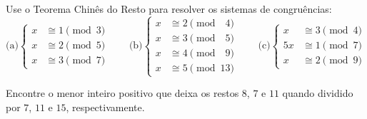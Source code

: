 \begin{homework}
    Use o Teorema Chinês do Resto para resolver os sistemas de congruências:
    $$
    \text{(a)}
    \left\{
            \begin{aligned}
                x&\cong 1\pmod 3\\
                x&\cong 2\pmod 5\\
                x&\cong 3\pmod 7
            \end{aligned}
    \right.
    \qquad
    \text{(b)}
    \left\{
            \begin{aligned} 
                x&\cong 2\pmod {\phantom 04}\\
                x&\cong 3\pmod {\phantom 05}\\
                x&\cong 4\pmod {\phantom 09}\\
                x&\cong 5\pmod {13}
            \end{aligned}
    \right.
    \qquad
    \text{(c)}
    \left\{
            \begin{aligned}
                x&\cong 3\pmod 4\\
               5x&\cong 1\pmod 7\\
                x&\cong 2\pmod 9
            \end{aligned}
    \right.
    $$
\end{homework}

\begin{homework}
    Encontre o menor inteiro positivo que deixa os restos $8$, $7$ e $11$ quando dividido por $7$, $11$ e $15$, respectivamente.
\end{homework}
